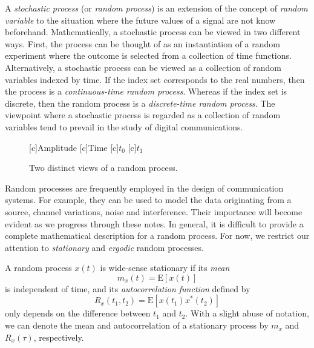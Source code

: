 A \emph{stochastic process} (or \emph{random process}) is an extension of the concept of \emph{random variable} to the situation where the future values of a signal are not know beforehand.
Mathematically, a stochastic process can be viewed in two different ways.
First, the process can be thought of as an instantiation of a random experiment where the outcome is selected from a collection of time functions.
Alternatively, a stochastic process can be viewed as a collection of random variables indexed by time.
If the index set corresponds to the real numbers, then the process is a \emph{continuous-time random process}.
Whereas if the index set is discrete, then the random process is a \emph{discrete-time random process}.
The viewpoint where a stochastic process is regarded as a collection of random variables tend to prevail in the study of digital communications.
\begin{figure}[htbp]
\begin{center}
\begin{psfrags}
[c]{Amplitude}
[c]{Time}
[c]{$t_0$}
[c]{$t_1$}
\end{psfrags}
\caption{Two distinct views of a random process.}
\label{figure:RandomProcess}
\end{center}
\end{figure}

Random processes are frequently employed in the design of communication systems.
For example, they can be used to model the data originating from a source, channel variations, noise and interference.
Their importance will become evident as we progress through these notes.
In general, it is difficult to provide a complete mathematical description for a random process.
For now, we restrict our attention to \emph{stationary} and \emph{ergodic} random processes.

\begin{definition}[Stationarity]
A random process $x(t)$ is wide-sense stationary if its \emph{mean}
\begin{equation*}
m_x(t) = \mathrm{E} [x(t)]
\end{equation*}
is independent of time, and its \emph{autocorrelation function} defined by
\begin{equation*}
R_x(t_1, t_2) = \mathrm{E} [x(t_1) x^*(t_2)]
\end{equation*}
only depends on the difference between $t_1$ and $t_2$.
With a slight abuse of notation, we can denote the mean and autocorrelation of a stationary process by $m_x$ and $R_x(\tau)$, respectively.
\end{definition}

